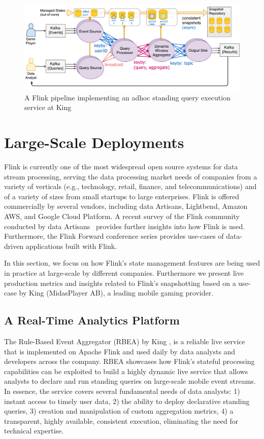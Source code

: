 \begin{figure}[t]
\centering
\includegraphics[width=\textwidth]{figures/rbea.pdf}
\caption{A Flink pipeline implementing an adhoc standing query execution service at King} 
\label{fig:rbea}
\vspace{-4mm}
\end{figure}



\section{Large-Scale Deployments}
\label{sec:evaluation}

Flink is currently one of the most widespread open source systems for data stream processing, serving the data processing market needs of companies from a variety of verticals (e.g., technology, retail, finance, and telecommunications) and of a variety of sizes from small startups to large enterprises. Flink is offered commercially by several vendors, including data Artisans, Lightbend, Amazon AWS, and Google Cloud Platform. A recent survey of the Flink community conducted by data Artisans \cite{CUSTOM:web/dartisanssurvey} provides further insights into how Flink is used. Furthermore, the Flink Forward conference series \cite{CUSTOM:web/flinkforward} provides use-cases of data-driven applications built with Flink.

In this section, we focus on how Flink's state management features are being used in practice at large-scale by different companies. Furthermore we present live production metrics and insights related to Flink's snapshotting based on a use-case by King (MidasPlayer AB), a leading mobile gaming provider.

\subsection{A Real-Time Analytics Platform}

The Rule-Based Event Aggregator (RBEA) by King \cite{CUSTOM:web/kingrbea}, is a reliable live service that is implemented on Apache Flink and used daily by data analysts and developers across the company. RBEA showcases how Flink's stateful processing capabilities can be exploited to build a highly dynamic live service that allows analysts to declare and run standing queries on large-scale mobile event streams. In essence, the service covers several fundamental needs of data analysts: 1) instant access to timely user data, 2) the ability to deploy declarative standing queries, 3) creation and manipulation of custom aggregation metrics, 4) a transparent, highly available, consistent execution, eliminating the need for technical expertise.

